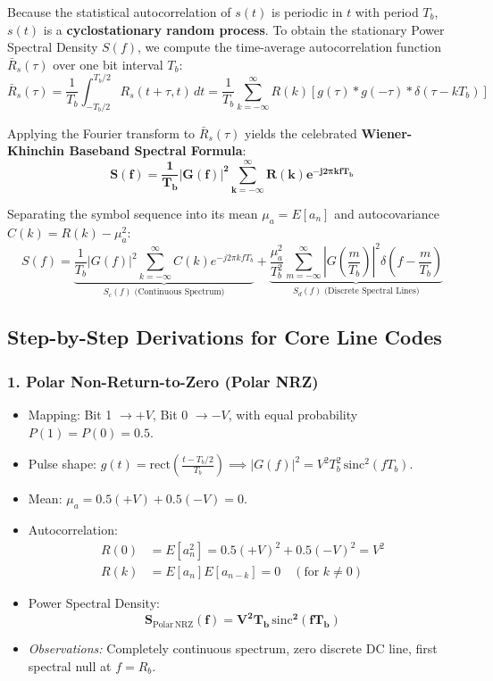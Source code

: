 \documentclass[11pt,a4paper]{article}
\begin{document}
Because the statistical autocorrelation of $s(t)$ is periodic in $t$ with period $T_b$, $s(t)$ is a \textbf{cyclostationary random process}. To obtain the stationary Power Spectral Density $S(f)$, we compute the time-average autocorrelation function $\bar{R}_s(\tau)$ over one bit interval $T_b$:
\begin{equation}
\bar{R}_s(\tau) = \frac{1}{T_b} \int_{-T_b/2}^{T_b/2} R_s(t + \tau, t) \, dt = \frac{1}{T_b} \sum_{k=-\infty}^{\infty} R(k) \left[ g(\tau) * g(-\tau) * \delta(\tau - k T_b) \right]
\end{equation}

Applying the Fourier transform to $\bar{R}_s(\tau)$ yields the celebrated \textbf{Wiener-Khinchin Baseband Spectral Formula}:
\begin{equation}
\mathbf{S(f) = \frac{1}{T_b} |G(f)|^2 \sum_{k=-\infty}^{\infty} R(k) e^{-j 2\pi k f T_b}}
\end{equation}

Separating the symbol sequence into its mean $\mu_a = E[a_n]$ and autocovariance $C(k) = R(k) - \mu_a^2$:
\begin{equation}
S(f) = \underbrace{\frac{1}{T_b} |G(f)|^2 \sum_{k=-\infty}^{\infty} C(k) e^{-j 2\pi k f T_b}}_{S_c(f) \text{ (Continuous Spectrum)}} + \underbrace{\frac{\mu_a^2}{T_b^2} \sum_{m=-\infty}^{\infty} \left|G\left(\frac{m}{T_b}\right)\right|^2 \delta\left(f - \frac{m}{T_b}\right)}_{S_d(f) \text{ (Discrete Spectral Lines)}}
\end{equation}

\subsection{Step-by-Step Derivations for Core Line Codes}

\subsubsection{1. Polar Non-Return-to-Zero (Polar NRZ)}
\begin{itemize}
    \item Mapping: Bit 1 $\to +V$, Bit 0 $\to -V$, with equal probability $P(1) = P(0) = 0.5$.
    \item Pulse shape: $g(t) = \mathrm{rect}\left(\frac{t - T_b/2}{T_b}\right) \implies |G(f)|^2 = V^2 T_b^2 \,\mathrm{sinc}^2(f T_b)$.
    \item Mean: $\mu_a = 0.5(+V) + 0.5(-V) = 0$.
    \item Autocorrelation:
    \begin{align}
    R(0) &= E[a_n^2] = 0.5(+V)^2 + 0.5(-V)^2 = V^2 \\
    R(k) &= E[a_n] E[a_{n-k}] = 0 \quad (\text{for } k \ne 0)
    \end{align}
    \item Power Spectral Density:
    \begin{equation}
    \mathbf{S_{\mathrm{Polar\,NRZ}}(f) = V^2 T_b \,\mathrm{sinc}^2(f T_b)}
    \end{equation}
    \item \textit{Observations:} Completely continuous spectrum, zero discrete DC line, first spectral null at $f = R_b$.
\end{itemize}
\end{document}
